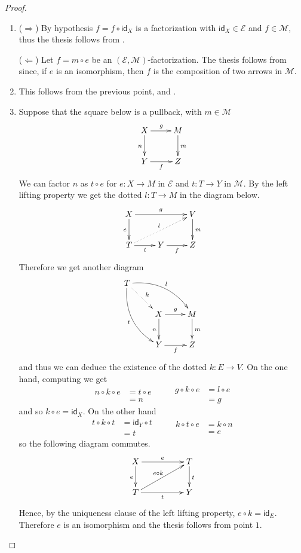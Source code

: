 \documentclass[a4paper]{article}
\newcommand{\id}[1]{\mathsf{id}_{#1}}
\theoremstyle{definition}
\begin{document}
\begin{proof}
	\begin{enumerate}
		\item  ($\Rightarrow$) By hypothesis $f=f\circ \id{X}$ is a factorization with $\id{X}\in \mathcal{E}$ and $f\in \mathcal{M}$, thus the thesis follows from .
		
		\smallskip \noindent
		($\Leftarrow$) Let $f=m\circ e$ be an $(\mathcal{E}, \mathcal{M})$-factorization. The thesis  follows from  since, if $e$ is an isomorphism, then $f$ is the composition of two arrows in $\mathcal{M}$.
		
		\item This follows from the previous point,  and .
		
		\item 	Suppose that the square below is a pullback, with $m\in \mathcal{M}$
		\[\xymatrix{X\ar[r]^{g} \ar[d]_{n} & M \ar[d]^{m} \\ Y \ar[r]_{f}  & Z}\] 
		We can factor  $n$ as $t\circ e$ for $e\colon X\to M$ in  $\mathcal{E}$ and $t\colon T\to Y$ in $ \mathcal{M}$.  By the left lifting property we get the dotted $l\colon T\to M$ in the diagram below.
		\[\xymatrix{X \ar[d]_{e}\ar[rr]^{g} & &V\ar[d]^{m}\\  T  \ar@{.>}[urr]^{l} \ar[r]_{t}&Y\ar[r]_{f} & Z}\]
		Therefore we get another diagram
		\[\xymatrix{ T \ar@/^.5cm/[drr]^{l}\ar@{.>}[dr]^{k} \ar@/_.5cm/[ddr]_{t}\\ & X \ar[d]_{n}\ar[r]^{g}& M  \ar[d]^{m} \\ &Y \ar[r]_{f} & Z }\]
		and thus we can deduce the existence of the dotted $k\colon E\to V$. On the one hand, computing we get
		\[\begin{split}
			n\circ 	k\circ e&=t  \circ  e\\ &=n
		\end{split}\qquad \begin{split}
			g\circ k\circ e &=l\circ e\\ &=g \end{split}\]
		and so $k\circ e= \id{X}$.  On the other hand 
		\[\begin{split}
			t\circ k \circ t &= \id{Y} \circ t \\&= t
		\end{split} \qquad 
		\begin{split}
			k \circ t \circ e &= k\circ n \\&= e
		\end{split}
		\]	
		so the following diagram commutes.
		\[
		\xymatrix@C=50pt{X \ar[d]_{e}\ar[r]^{e}& T \ar[d]^{t} \\
			T\ar[ur]^{e\circ k}\ar[r]_{t} & Y}\]
		Hence, by the uniqueness clause of the left lifting property, $e\circ k=\id{E}$. Therefore $e$ is an isomorphism and the thesis follows from  point $1$. 
		

\end{enumerate}
\end{proof}
\end{document}
